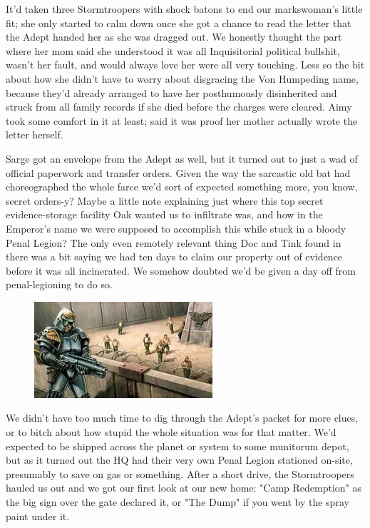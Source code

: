It'd taken three Stormtroopers with shock batons to end our markswoman's little fit; 
she only started to calm down once she got a chance to read the letter that the Adept handed her as she was dragged out. 
We honestly thought the part where her mom said she understood it was all Inquisitorial political bullshit, wasn't her fault, and would always love her were all very touching. 
Less so the bit about how she didn't have to worry about disgracing the Von Humpeding name, because they'd already arranged to have her posthumously disinherited and struck from all family records if she died before the charges were cleared. 
Aimy took some comfort in it at least; 
said it was proof her mother actually wrote the letter herself.

Sarge got an envelope from the Adept as well, but it turned out to just a wad of official paperwork and transfer orders. 
Given the way the sarcastic old bat had choreographed the whole farce we'd sort of expected something more, you know, secret orders-y? 
Maybe a little note explaining just where this top secret evidence-storage facility Oak wanted us to infiltrate was, and how in the Emperor's name we were supposed to accomplish this while stuck in a bloody Penal Legion? 
The only even remotely relevant thing Doc and Tink found in there was a bit saying we had ten days to claim our property out of evidence before it was all incinerated. 
We somehow doubted we'd be given a day off from penal-legioning to do so.

\begin{figure}
	\begin{center}
		\includegraphics[width=\figwidth]{pics/21/6.png}
	\end{center}
\end{figure}
We didn't have too much time to dig through the Adept's packet for more clues, or to bitch about how stupid the whole situation was for that matter. 
We'd expected to be shipped across the planet or system to some munitorum depot, but as it turned out the HQ had their very own Penal Legion stationed on-site, presumably to save on gas or something. 
After a short drive, the Stormtroopers hauled us out and we got our first look at our new home: 
"Camp Redemption" as the big sign over the gate declared it, or "The Dump" if you went by the spray paint under it.

